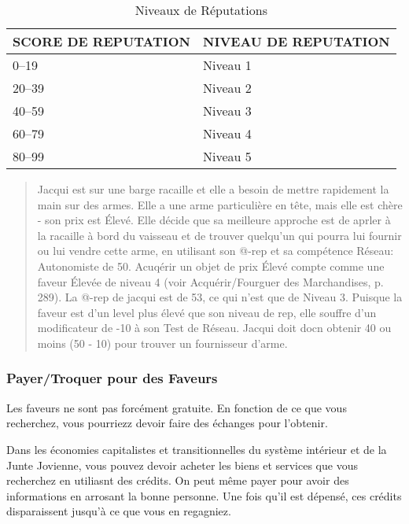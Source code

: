 \begin{table} \caption{Niveaux de Réputations} \begin{tabular}{|l|l|} \hline

SCORE DE REPUTATION &NIVEAU DE REPUTATION \\ \hline

0–19 &Niveau 1 \\ \hline

20–39 &Niveau 2 \\ \hline

40–59 &Niveau 3 \\ \hline

60–79 &Niveau 4 \\ \hline

80–99 &Niveau 5 \\ \hline

\end{tabular} \end{table} 

\begin{quotation} Jacqui est sur une barge racaille et elle a besoin de mettre rapidement la main sur des armes. Elle a une arme particulière en tête, mais elle est chère - son prix est Élevé. Elle décide que sa meilleure approche est de aprler à la racaille à bord du vaisseau et de trouver quelqu'un qui pourra lui fournir ou lui vendre cette arme, en utilisant son @-rep et sa compétence Réseau: Autonomiste de 50. Acuqérir un objet de prix Élevé compte comme une faveur Élevée de niveau 4 (voir Acquérir/Fourguer des Marchandises, p. 289). La @-rep de jacqui est de 53, ce qui n'est que de Niveau 3. Puisque la faveur est d'un level plus élevé que son niveau de rep, elle souffre d'un modificateur de -10 à son Test de Réseau. Jacqui doit docn obtenir 40 ou moins (50 - 10) pour trouver un fournisseur d'arme. \end{quotation} 





\subsubsection{Payer/Troquer pour des Faveurs} 

Les faveurs ne sont pas forcément gratuite. En fonction de ce que vous recherchez, vous pourriezz devoir faire des échanges pour l'obtenir. 

Dans les économies capitalistes et transitionnelles du système intérieur et de la Junte Jovienne, vous pouvez devoir acheter les biens et services que vous recherchez en utiliasnt des crédits. On peut même payer pour avoir des informations en arrosant la bonne personne. Une fois qu'il est dépensé, ces crédits disparaissent jusqu'à ce que vous en regagniez. 

